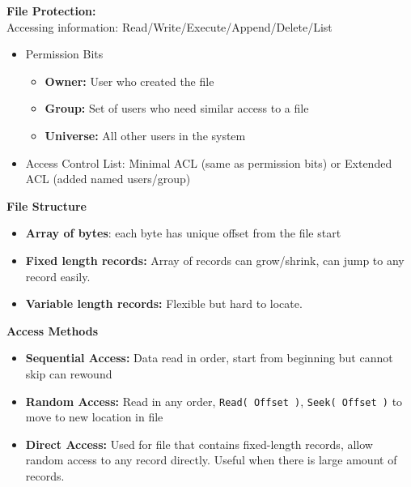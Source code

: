 \documentclass[10pt,landscape]{article}
\begin{document}
\begin{multicols*}{3}
\textbf{File Protection:} \\
Accessing information: Read/Write/Execute/Append/Delete/List
\begin{itemize}[topsep=0pt,noitemsep,wide=0pt, leftmargin=\dimexpr{} + 2\relax]
    \item Permission Bits
    \begin{itemize}[topsep=0pt,noitemsep,wide=0pt, leftmargin=\dimexpr{} + 2\relax]
        \item \textbf{Owner:} User who created the file
        \item \textbf{Group:} Set of users who need similar access to a file
        \item \textbf{Universe:} All other users in the system
    \end{itemize}
    \item Access Control List: Minimal ACL (same as permission bits) or Extended ACL (added named users/group)
\end{itemize}

\textbf{File Structure}
\begin{itemize}[topsep=0pt,noitemsep,wide=0pt, leftmargin=\dimexpr{} + 2\relax]
    \item \textbf{Array of bytes}: each byte has unique offset from the file start
    \item \textbf{Fixed length records:} Array of records can grow/shrink, can jump to any record easily.
    \item \textbf{Variable length records:} Flexible but hard to locate.
\end{itemize}

\textbf{Access Methods}
\begin{itemize}[topsep=0pt,noitemsep,wide=0pt, leftmargin=\dimexpr{} + 2\relax]
    \item \textbf{Sequential Access:} Data read in order, start from beginning but cannot skip can rewound
    \item \textbf{Random Access:} Read in any order, \verb|Read( Offset )|, \verb|Seek( Offset )| to move to new location in file
    \item \textbf{Direct Access:} Used for file that contains fixed-length records, allow random access to any record directly. Useful when there is large amount of records.
\end{itemize}


\end{multicols*}
\end{document}
